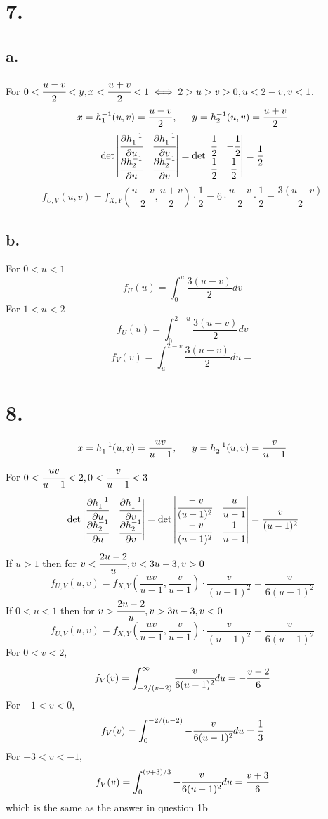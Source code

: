 \documentclass[11pt]{article}
\begin{document}
\section*{7.}
\subsection*{a.}
For $0<\cfrac{u-v}{2}<y, x<\cfrac{u+v}{2}<1 \iff 2>u>v>0, u<2-v, v<1$.
\[
    x = h_1^{-1}(u,v) = \frac{u-v}{2}, \indent y = h_2^{-1}(u,v) = \frac{u+v}{2}    
\]
\[
    \det 
    \begin{vmatrix}
        \cfrac{\partial h_1^{-1}}{\partial u} & \cfrac{\partial h_1^{-1}}{\partial v} \\
        \cfrac{\partial h_2^{-1}}{\partial u} & \cfrac{\partial h_2^{-1}}{\partial v}
    \end{vmatrix}    
    = 
    \det 
    \begin{vmatrix}
        \cfrac{1}{2} & -\cfrac{1}{2} \\
        \cfrac{1}{2} & \cfrac{1}{2} 
    \end{vmatrix}
    = \frac{1}{2}
\]
\[
    f_{U,V}(u,v) = f_{X,Y}\left( \frac{u-v}{2}, \frac{u+v}{2}\right) \cdot \frac{1}{2} 
    = 6 \cdot \frac{u-v}{2} \cdot \frac{1}{2} = \frac{3(u-v)}{2}     
\]
\subsection*{b.}
For $0<u<1$
\[
    f_U(u) =  \int_0^{u} \frac{3(u-v)}{2} dv
\]
For $1<u<2$
\[
    f_U(u) =  \int_0^{2-u} \frac{3(u-v)}{2} dv
\]
\[
    f_V(v) = \int_u^{2-v} \frac{3(u-v)}{2} du =
\]
\pagebreak
\section*{8.}
\[
    x = h_1^{-1}(u,v) = \frac{uv}{u-1}, \indent y = h_2^{-1}(u,v) = \frac{v}{u-1}
\]
For $0<\cfrac{uv}{u-1}<2, 0<\cfrac{v}{u-1}<3$ 
\[
    \det 
    \begin{vmatrix}
        \cfrac{\partial h_1^{-1}}{\partial u} & \cfrac{\partial h_1^{-1}}{\partial v} \\
        \cfrac{\partial h_2^{-1}}{\partial u} & \cfrac{\partial h_2^{-1}}{\partial v}
    \end{vmatrix}    
    = 
    \det 
    \begin{vmatrix}
        \cfrac{-v}{(u-1)^2} & \cfrac{u}{u-1} \\
        \cfrac{-v}{(u-1)^2} & \cfrac{1}{u-1} 
    \end{vmatrix}
    = \cfrac{v}{(u-1)^2}
\]
If $u>1$ then for $v<\cfrac{2u-2}{u}, v < 3u-3, v>0$ 
\[
    f_{U,V}(u,v) = f_{X,Y}\left(\frac{uv}{u-1}, \frac{v}{u-1}\right) \cdot \frac{v}{(u-1)^2} = \frac{v}{6(u-1)^2}
\]
If $0<u<1$ then for $v>\cfrac{2u-2}{u}, v>3u-3, v<0$
\[
    f_{U,V}(u,v) = f_{X,Y}\left(\frac{uv}{u-1}, \frac{v}{u-1}\right) \cdot \frac{v}{(u-1)^2} = \frac{v}{6(u-1)^2}
\]
For $0<v<2$, 
\[
    f_V(v) = \int_{-2/(v-2)}^\infty \cfrac{v}{6(u-1)^2} du  = -\frac{v-2}{6}
\]
For $-1<v<0$,
\[
    f_V(v) = \int_{0}^{-2/(v-2)} -\cfrac{v}{6(u-1)^2} du = \frac{1}{3}
\]
For $-3<v<-1$,
\[
    f_V(v) = \int_{0}^{(v+3)/3} -\cfrac{v}{6(u-1)^2} du = \frac{v+3}{6}
\]
which is the same as the answer in question 1b
\pagebreak
\end{document}
